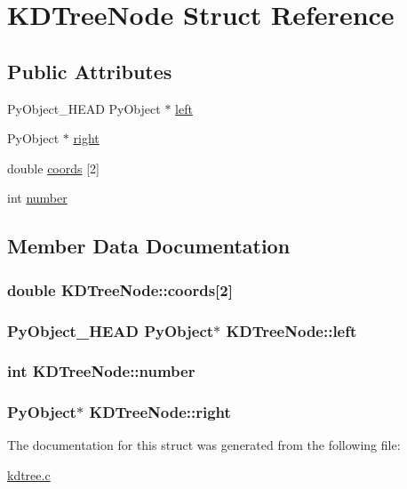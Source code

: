 \hypertarget{structKDTreeNode}{
\section{KDTreeNode Struct Reference}
\label{structKDTreeNode}
}
\subsection*{Public Attributes}
\begin{DoxyCompactItemize}
\item 
PyObject\_\-HEAD PyObject $\ast$ \hyperlink{structKDTreeNode_a9c1ebd01748f82c40fe7f2e6bf5be08e}{left}
\item 
PyObject $\ast$ \hyperlink{structKDTreeNode_a57fe467af332c2c4bad6d1056cccf367}{right}
\item 
double \hyperlink{structKDTreeNode_aae887789debf28e0b4834b19aae2277c}{coords} \mbox{[}2\mbox{]}
\item 
int \hyperlink{structKDTreeNode_a93fa386e352795cc9e08be4e9b99c39b}{number}
\end{DoxyCompactItemize}


\subsection{Member Data Documentation}
\hypertarget{structKDTreeNode_aae887789debf28e0b4834b19aae2277c}{
\subsubsection[{coords}]{\setlength{\rightskip}{0pt plus 5cm}double {\bf KDTreeNode::coords}\mbox{[}2\mbox{]}}}
\label{structKDTreeNode_aae887789debf28e0b4834b19aae2277c}
\hypertarget{structKDTreeNode_a9c1ebd01748f82c40fe7f2e6bf5be08e}{
\subsubsection[{left}]{\setlength{\rightskip}{0pt plus 5cm}PyObject\_\-HEAD PyObject$\ast$ {\bf KDTreeNode::left}}}
\label{structKDTreeNode_a9c1ebd01748f82c40fe7f2e6bf5be08e}
\hypertarget{structKDTreeNode_a93fa386e352795cc9e08be4e9b99c39b}{
\subsubsection[{number}]{\setlength{\rightskip}{0pt plus 5cm}int {\bf KDTreeNode::number}}}
\label{structKDTreeNode_a93fa386e352795cc9e08be4e9b99c39b}
\hypertarget{structKDTreeNode_a57fe467af332c2c4bad6d1056cccf367}{
\subsubsection[{right}]{\setlength{\rightskip}{0pt plus 5cm}PyObject$\ast$ {\bf KDTreeNode::right}}}
\label{structKDTreeNode_a57fe467af332c2c4bad6d1056cccf367}


The documentation for this struct was generated from the following file:\begin{DoxyCompactItemize}
\item 
\hyperlink{kdtree_8c}{kdtree.c}\end{DoxyCompactItemize}
